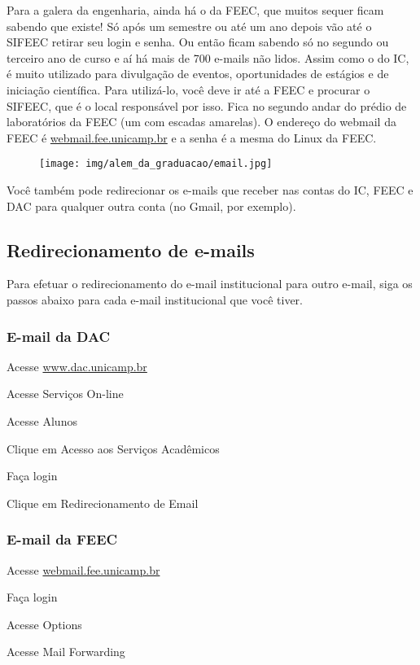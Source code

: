 Para a galera da engenharia, ainda há o da FEEC, que muitos sequer ficam
sabendo que existe! Só após um semestre ou até um ano depois vão até o SIFEEC
retirar seu login e senha. Ou então ficam sabendo só no segundo ou terceiro ano
de curso e aí há mais de 700 e-mails não lidos. Assim como o do IC, é muito
utilizado para divulgação de eventos, oportunidades de estágios e de iniciação
científica. Para utilizá-lo, você deve ir até a FEEC e procurar o SIFEEC, que é
o local responsável por isso. Fica no segundo andar do prédio de laboratórios
da FEEC (um com escadas amarelas). O endereço do webmail da FEEC é
\url{webmail.fee.unicamp.br} e a senha é a mesma do Linux da FEEC.

\begin{figure}[b!]
    \centering
    \texttt{[image: img/alem\_da\_graduacao/email.jpg]}
\end{figure}

Você também pode redirecionar os e-mails que receber nas contas do IC, FEEC e
DAC para qualquer outra conta (no Gmail, por exemplo).

\subsection{Redirecionamento de e-mails}
Para efetuar o redirecionamento do e-mail institucional para outro e-mail, siga
os passos abaixo para cada e-mail institucional que você tiver.

\subsubsection{E-mail da DAC}

\begin{compactenumerate}
\item Acesse \url{www.dac.unicamp.br}
\item Acesse Serviços On-line
\item Acesse Alunos
\item Clique em Acesso aos Serviços Acadêmicos
\item Faça login
\item Clique em Redirecionamento de Email
\end{compactenumerate}

\subsubsection{E-mail da FEEC}

\begin{compactenumerate}
\item Acesse \url{webmail.fee.unicamp.br}
\item Faça login
\item Acesse Options
\item Acesse Mail Forwarding
\end{compactenumerate}

